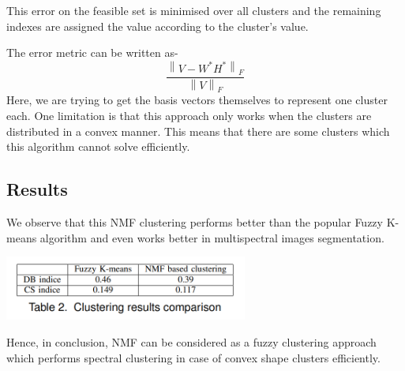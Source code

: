 \documentclass[a4paper,14pt]{article}
\numberwithin{definition}{section}
\numberwithin{mytheorem}{subsection}
\newcommand\norm[1]{\left\lVert#1\right\rVert}
\begin{document}
This error on the feasible set is minimised over all clusters and the remaining indexes are assigned the value according to the cluster's value.

The error metric can be written as-
$$\frac{\norm{V - W^*H^*}_F}{\norm{V}_F}$$
Here, we are trying to get the basis vectors themselves to represent one cluster each. One limitation is that this approach only works when the clusters are distributed in a convex manner. This means that there are some clusters which this algorithm cannot solve efficiently.

\subsection{Results}
We observe that this NMF clustering performs better than the popular Fuzzy K-means algorithm and even works better in multispectral images segmentation.
\begin{center}
    \includegraphics[width=8cm]{result.png}
\end{center}

Hence, in conclusion, NMF can be considered as a fuzzy clustering approach which performs spectral clustering in case of convex shape clusters efficiently.
\end{document}
